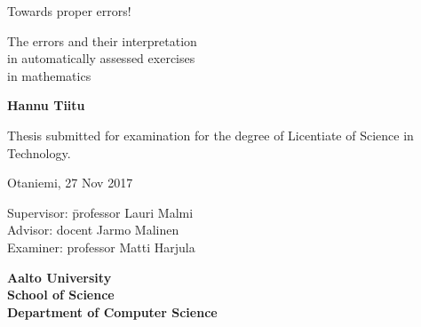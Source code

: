 {\parindent0pt %
\begin{spacing}{1.1}

 {\sffamily{}}
\end{spacing}

\vspace{12.7mm}

\begin{spacing}{1.63}
{\fontsize{17.8pt}{17.8pt}\selectfont Towards proper errors!}
\end{spacing}

\vspace{10.5mm}

\begin{spacing}{1.2}
{\fontsize{13pt}{13pt}\selectfont The errors and their interpretation\\in automatically assessed exercises\\in mathematics}
\end{spacing}

\vspace{10.6mm}

{\fontsize{13.9pt}{13.9pt}\bfseries\sffamily\lsstyle Hannu Tiitu}

\vfill

{\fontsize{10.3pt}{10.3pt}\sffamily\lsstyle\raggedright
\begin{spacing}{1.06}

Thesis submitted for examination for the degree of Licentiate of
Science in Technology.

Otaniemi, 27 Nov 2017

\begin{tabbing}
Supervisor:\hspace{6mm} \= professor Lauri Malmi \\
Advisor: \> docent Jarmo Malinen \\
Examiner: \> professor Matti Harjula
\end{tabbing}
\vspace{-4mm}
\end{spacing}
} %

\vspace{11.5mm}

\begin{spacing}{.9}
{\bfseries\sffamily\lsstyle Aalto University \\
School of Science \\
Department of Computer Science}
\end{spacing}
} %



